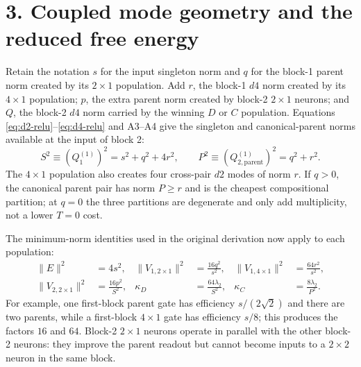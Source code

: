 \documentclass[10pt]{article}
\begin{document}
\section*{3. Coupled mode geometry and the reduced free energy}
Retain the notation $s$ for the input singleton norm and $q$ for the block-1 parent norm
created by its $2\times1$ population.  Add $r$, the block-1 $d4$ norm created by its
$4\times1$ population; $p$, the extra parent norm created by block-2 $2\times1$ neurons; and
$Q$, the block-2 $d4$ norm carried by the winning $D$ or $C$ population.  Equations
\eqref{eq:d2-relu}--\eqref{eq:d4-relu} and A3--A4 give the singleton and canonical-parent norms
available at the input of block 2:
\begin{equation}
\boxed{S^2\equiv(Q_1^{(1)})^2=s^2+q^2+4r^2,
\qquad P^2\equiv(Q_{2,\mathrm{parent}}^{(1)})^2=q^2+r^2.}
\label{eq:SP}
\end{equation}
The $4\times1$ population also creates four cross-pair $d2$ modes of norm $r$.  If $q>0$,
the canonical parent pair has norm $P\geq r$ and is the cheapest compositional partition; at
$q=0$ the three partitions are degenerate and only add multiplicity, not a lower $T=0$ cost.

The minimum-norm identities used in the original derivation now apply to each population:
\begin{align}
\|E\|^2&=4s^2,&
\|V_{1,2\times1}\|^2&=\frac{16q^2}{s^2},&
\|V_{1,4\times1}\|^2&=\frac{64r^2}{s^2},\nonumber\\[-2pt]
\|V_{2,2\times1}\|^2&=\frac{16p^2}{S^2},&
\kappa_D&=\frac{64\lambda_2}{S^2},&
\kappa_C&=\frac{8\lambda_2}{P^2}.
\label{eq:costs}
\end{align}
For example, one first-block parent gate has efficiency $s/(2\sqrt2)$ and there are two
parents, while a first-block $4\times1$ gate has efficiency $s/8$; this produces the factors
$16$ and $64$.  Block-2 $2\times1$ neurons operate in parallel with the other block-2
neurons: they improve the parent readout but cannot become inputs to a $2\times2$ neuron in
the same block.
\end{document}
